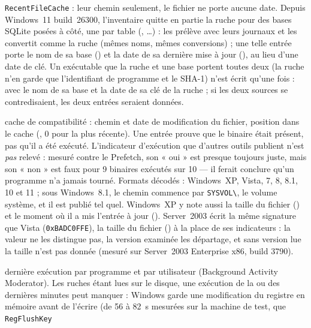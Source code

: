 \documentclass[11pt,a4paper,oneside]{report}
\begin{document}
\begin{description}[style=nextline,leftmargin=1.2em]
        \texttt{RecentFileCache} : leur chemin seulement, le fichier ne porte
        aucune date. Depuis Windows~11 build~26300, l'inventaire quitte en
        partie la ruche pour des bases SQLite posées à côté, une par table
        (, …) :
        \wac{} les prélève avec leurs journaux et les convertit comme la ruche
        (mêmes noms, mêmes conversions) ; une telle entrée porte le nom de sa
        base () et la date de sa dernière mise à jour
        (), au lieu d'une date de clé. Un exécutable que la
        ruche et une base portent toutes deux (la ruche n'en garde que
        l'identifiant de programme et le SHA-1) n'est écrit qu'une fois : avec
        le nom de sa base et la date de sa clé de la ruche ; si les deux
        sources se contredisaient, les deux entrées seraient données.
  \item[\fichier{shimcache.json}] cache de compatibilité : chemin et date de
        modification du fichier, position dans le cache (,
        0 pour la plus récente). Une entrée prouve que le binaire était présent,
        pas qu'il a été exécuté. L'indicateur d'exécution que d'autres outils
        publient n'est \emph{pas} relevé : mesuré contre le Prefetch, son « oui »
        est presque toujours juste, mais son « non » est faux pour 9 binaires
        exécutés sur 10 — il ferait conclure qu'un programme n'a jamais tourné.
        Formats décodés : Windows~XP, Vista, 7, 8, 8.1, 10 et 11 ; sous Windows~8.1, le chemin
        commence par \texttt{SYSVOL\textbackslash}, le volume système, et il est
        publié tel quel. Windows~XP y note aussi la taille du fichier
        () et le moment où il a mis l'entrée à jour
        (). Server~2003 écrit la même signature que Vista
        (\texttt{0xBADC0FFE}), la taille du fichier () à la
        place de ses indicateurs : la valeur ne les distingue pas, la version
        examinée les départage, et sans version lue la taille n'est pas
        donnée (mesuré sur Server~2003 Enterprise x86, build 3790).
  \item[\fichier{bams.json}] dernière exécution par programme et par utilisateur
        (Background Activity Moderator). Les ruches étant lues sur le disque,
        une exécution de la ou des dernières minutes peut manquer : Windows
        garde une modification du registre en mémoire avant de l'écrire (de
        56 à 82~s mesurées sur la machine de test, que \texttt{RegFlushKey}

\end{description}
\end{document}
